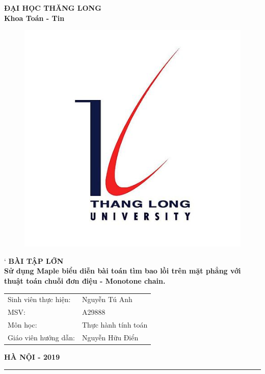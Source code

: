 %
\begin{titlepage}
    \begin{center}
        {\bfseries ĐẠI HỌC THĂNG LONG\\Khoa Toán - Tin}
    \end{center}
    \vspace*{1cm}
    \begin{figure}[!ht]
        \centering
        \includegraphics[scale = 0.4]{Image/LogoTLU}
    \end{figure}
    \vspace*{1cm}
    \begin{center}
`       {\Large \bfseries BÀI TẬP LỚN\\}
        \vspace*{1cm}
        {\huge \bfseries  Sử dụng Maple biểu diễn bài toán tìm bao lồi trên mặt phẳng với thuật toán chuỗi đơn điệu - Monotone chain.}
    \end{center}
    \vspace*{1cm}
    \begin{flushright}
        \parbox[l]{8cm}{
            \bfseries
            \begin{tabular}{ l  l }
                Sinh viên thực hiện:& Nguyễn Tú Anh \\
                MSV:& A29888  \\
                Môn học:& Thực hành tính toán\\
                Giáo viên hướng dẫn:& Nguyễn Hữu Điển \\
            \end{tabular}
        }
    \end{flushright}
    \vfill
    \centerline{\bf HÀ NỘI - 2019}
\end{titlepage}
\vfill
\hrule
\thispagestyle{empty}